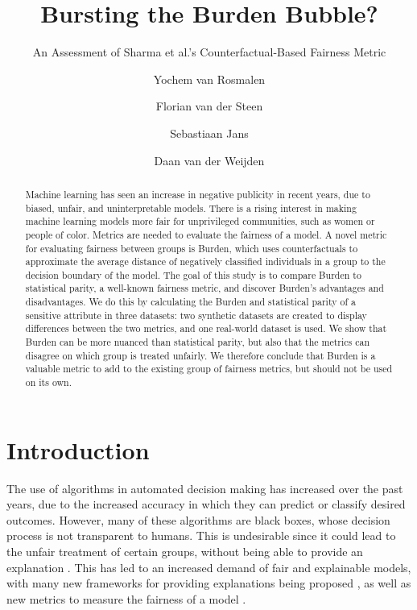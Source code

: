 \documentclass[runningheads]{llncs}
\begin{document}
\title{Bursting the Burden Bubble?}
\subtitle{An Assessment of Sharma et al.'s Counterfactual-Based Fairness Metric}

\author{
Yochem van Rosmalen
\and
Florian van der Steen
\and
Sebastiaan Jans
\and
Daan van der Weijden
}



\maketitle

\begin{abstract}
Machine learning has seen an increase in negative publicity in recent years,
due to biased, unfair, and uninterpretable models. There is a rising
interest in making machine learning models more fair for unprivileged
communities, such as women or people of color. Metrics are needed to
evaluate the fairness of a model. A novel metric for evaluating fairness
between groups is Burden, which uses counterfactuals to approximate the
average distance of negatively classified individuals in a group to the
decision boundary of the model. The goal of this study is to compare Burden
to statistical parity, a well-known fairness metric, and discover Burden's
advantages and disadvantages. We do this by calculating the Burden and
statistical parity of a sensitive attribute in three datasets: two
synthetic datasets are created to display differences between the two
metrics, and one real-world dataset is used. We show that Burden can be
more nuanced than statistical parity, but also that the metrics can
disagree on which group is treated unfairly. We therefore conclude that
Burden is a valuable metric to add to the existing group of fairness
metrics, but should not be used on its own.
\end{abstract}

\section{Introduction}

The use of algorithms in automated decision making has increased over the past
years, due to the increased accuracy in which they can predict or classify
desired outcomes. However, many of these algorithms are black boxes, whose
decision process is not transparent to humans. This is undesirable since it
could lead to the unfair treatment of certain groups, without being able to
provide an explanation \cite{angwin2016machine}. This has led to an increased
demand of fair and explainable models, with many new frameworks for providing
explanations being proposed
\cite{lundberg2017shap,ribeiro2016lime,ribeiro2018anchors}, as well as new
metrics to measure the fairness of a model
\cite{kamiran2009demographicparity,hardt2016equalisedodds,woodworth2017learning}.
\end{document}
